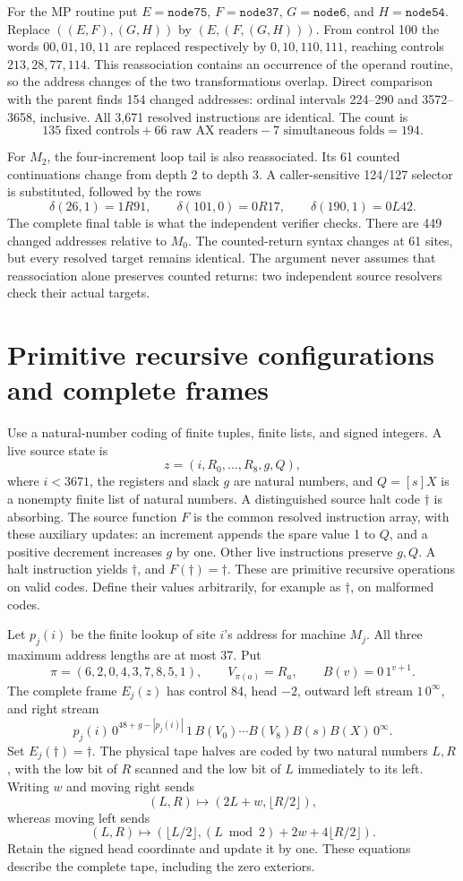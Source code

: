 \documentclass[11pt]{article}
\begin{document}
For the MP routine put
$E=\texttt{node75}$, $F=\texttt{node37}$,
$G=\texttt{node6}$, and $H=\texttt{node54}$.
Replace $((E,F),(G,H))$ by $(E,(F,(G,H)))$.
From control 100 the words $00,01,10,11$ are replaced respectively by
$0,10,110,111$, reaching controls $213,28,77,114$.
This reassociation contains an occurrence of the operand routine, so the
address changes of the two transformations overlap. Direct comparison
with the parent finds 154 changed addresses: ordinal intervals 224--290
and 3572--3658, inclusive. All 3,671 resolved instructions are identical.
The count is
\[
 135\text{ fixed controls}+66\text{ raw AX readers}
 -7\text{ simultaneous folds}=194.
\]

For $M_2$, the four-increment loop tail is also reassociated. Its 61
counted continuations change from depth 2 to depth 3. A caller-sensitive
124/127 selector is substituted, followed by the rows
\[
 \delta(26,1)=1R91,\qquad
 \delta(101,0)=0R17,\qquad
 \delta(190,1)=0L42.
\]
The complete final table is what the independent verifier checks.
There are 449 changed addresses relative to $M_0$. The counted-return
syntax changes at 61 sites, but every resolved target remains identical.
The argument never assumes that reassociation alone preserves counted
returns: two independent source resolvers check their actual targets.

\section{Primitive recursive configurations and complete frames}

Use a natural-number coding of finite tuples, finite lists, and signed
integers. A live source state is
\[
 z=(i,R_0,\ldots,R_8,g,Q),
\]
where $i<3671$, the registers and slack $g$ are natural numbers, and
$Q=[s]X$ is a nonempty finite list of natural numbers. A distinguished
source halt code $\dagger$ is absorbing. The source function $F$ is the
common resolved instruction array, with these auxiliary updates:
an increment appends the spare value 1 to $Q$, and a positive decrement
increases $g$ by one. Other live instructions preserve $g,Q$.
A halt instruction yields $\dagger$, and $F(\dagger)=\dagger$.
These are primitive recursive operations on valid codes. Define their
values arbitrarily, for example as $\dagger$, on malformed codes.

Let $p_j(i)$ be the finite lookup of site $i$'s address for machine $M_j$.
All three maximum address lengths are at most 37. Put
\[
 \pi=(6,2,0,4,3,7,8,5,1),\qquad V_{\pi(a)}=R_a,\qquad
 B(v)=0\,1^{v+1}.
\]
The complete frame $E_j(z)$ has control 84, head $-2$, outward left
stream $1\,0^\infty$, and right stream
\[
 p_j(i)\,0^{48+g-|p_j(i)|}\,1\,
 B(V_0)\cdots B(V_8)B(s)B(X)\,0^\infty.                 \tag{1}
\]
Set $E_j(\dagger)=\dagger$. The physical tape halves are coded by two
natural numbers $L,R$, with the low bit of $R$ scanned and the low bit of
$L$ immediately to its left. Writing $w$ and moving right sends
\[
 (L,R)\longmapsto(2L+w,\lfloor R/2\rfloor),
\]
whereas moving left sends
\[
 (L,R)\longmapsto
 (\lfloor L/2\rfloor,(L\bmod2)+2w+4\lfloor R/2\rfloor).
\]
Retain the signed head coordinate and update it by one. These equations
describe the complete tape, including the zero exteriors.
\end{document}
